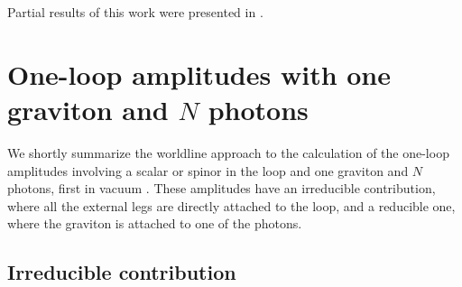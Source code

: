 \documentclass[a4paper,11pt]{article}
\begin{document}
Partial results of this work were presented in \cite{144}. 
 

\section{One-loop amplitudes with one graviton and $N$ photons}
\label{wlrep}
\renewcommand{\theequation}{2.\arabic{equation}}
\setcounter{equation}{0}


We shortly summarize the worldline approach to the calculation of the 
one-loop amplitudes involving a scalar or spinor in the loop and one graviton and $N$ photons, first in vacuum
 \cite{baszir,bacozi1,bacozi2,basvan-book,87,125}. 
These amplitudes have an irreducible contribution, where all the external legs are directly attached to the loop,
and a reducible one, where the graviton is attached to one of the photons. 


\subsection{Irreducible contribution}
\end{document}
